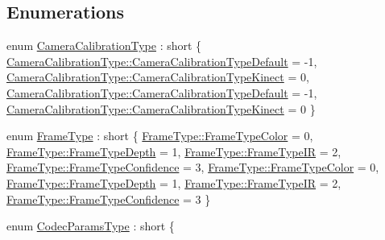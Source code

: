 \subsection*{Enumerations}
\begin{DoxyCompactItemize}
\item 
enum \hyperlink{namespacemoetsi_1_1ssp_a1f51291db51233dc5865d42e6ee36ef8}{Camera\+Calibration\+Type} \+: short \{ \hyperlink{namespacemoetsi_1_1ssp_a1f51291db51233dc5865d42e6ee36ef8ac32f0bb1b309dd3992d8e37bfaa00c78}{Camera\+Calibration\+Type\+::\+Camera\+Calibration\+Type\+Default} = -\/1, 
\hyperlink{namespacemoetsi_1_1ssp_a1f51291db51233dc5865d42e6ee36ef8a662285f55328b6f7305456b86b8056bb}{Camera\+Calibration\+Type\+::\+Camera\+Calibration\+Type\+Kinect} = 0, 
\hyperlink{namespacemoetsi_1_1ssp_a1f51291db51233dc5865d42e6ee36ef8ac32f0bb1b309dd3992d8e37bfaa00c78}{Camera\+Calibration\+Type\+::\+Camera\+Calibration\+Type\+Default} = -\/1, 
\hyperlink{namespacemoetsi_1_1ssp_a1f51291db51233dc5865d42e6ee36ef8a662285f55328b6f7305456b86b8056bb}{Camera\+Calibration\+Type\+::\+Camera\+Calibration\+Type\+Kinect} = 0
 \}
\item 
enum \hyperlink{namespacemoetsi_1_1ssp_a46efdfa2cd5a28ead465dcc8006b5a87}{Frame\+Type} \+: short \{ \newline
\hyperlink{namespacemoetsi_1_1ssp_a46efdfa2cd5a28ead465dcc8006b5a87ad039a5ecd3504edc955b88006db4ba21}{Frame\+Type\+::\+Frame\+Type\+Color} = 0, 
\hyperlink{namespacemoetsi_1_1ssp_a46efdfa2cd5a28ead465dcc8006b5a87a59cea6d94577d85ef8e142036e047064}{Frame\+Type\+::\+Frame\+Type\+Depth} = 1, 
\hyperlink{namespacemoetsi_1_1ssp_a46efdfa2cd5a28ead465dcc8006b5a87a2c799f7416882b538fa8295567f65cf5}{Frame\+Type\+::\+Frame\+Type\+IR} = 2, 
\hyperlink{namespacemoetsi_1_1ssp_a46efdfa2cd5a28ead465dcc8006b5a87a1b85b2c60b857778932e29e0e5021ba1}{Frame\+Type\+::\+Frame\+Type\+Confidence} = 3, 
\newline
\hyperlink{namespacemoetsi_1_1ssp_a46efdfa2cd5a28ead465dcc8006b5a87ad039a5ecd3504edc955b88006db4ba21}{Frame\+Type\+::\+Frame\+Type\+Color} = 0, 
\hyperlink{namespacemoetsi_1_1ssp_a46efdfa2cd5a28ead465dcc8006b5a87a59cea6d94577d85ef8e142036e047064}{Frame\+Type\+::\+Frame\+Type\+Depth} = 1, 
\hyperlink{namespacemoetsi_1_1ssp_a46efdfa2cd5a28ead465dcc8006b5a87a2c799f7416882b538fa8295567f65cf5}{Frame\+Type\+::\+Frame\+Type\+IR} = 2, 
\hyperlink{namespacemoetsi_1_1ssp_a46efdfa2cd5a28ead465dcc8006b5a87a1b85b2c60b857778932e29e0e5021ba1}{Frame\+Type\+::\+Frame\+Type\+Confidence} = 3
 \}
\item 
enum \hyperlink{namespacemoetsi_1_1ssp_a6d638ba0bd38e9daded08f633d893563}{Codec\+Params\+Type} \+: short \{ \newline

\end{DoxyCompactItemize}

